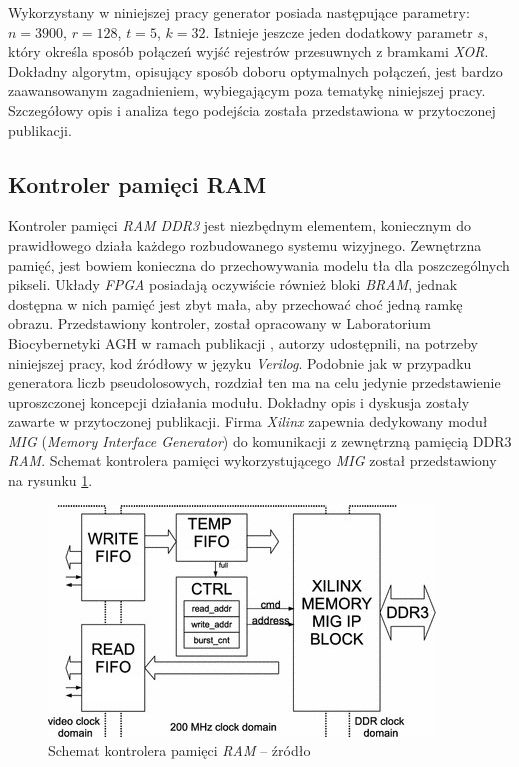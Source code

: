 Wykorzystany w niniejszej pracy generator posiada następujące parametry: $n=3900$, $r=128$, $t=5$, $k=32$. 
Istnieje jeszcze jeden dodatkowy parametr $s$, który określa sposób połączeń wyjść rejestrów przesuwnych z bramkami \textit{XOR}. 
Dokładny algorytm, opisujący sposób doboru optymalnych połączeń, jest bardzo zaawansowanym zagadnieniem, wybiegającym poza tematykę niniejszej pracy. 
Szczegółowy opis i analiza tego podejścia została przedstawiona w przytoczonej publikacji.

\subsection{Kontroler pamięci RAM}
\label{subsec:fpga_ram_kontroler}

Kontroler pamięci \textit{RAM DDR3} jest niezbędnym elementem, koniecznym do prawidłowego działa każdego rozbudowanego systemu wizyjnego. Zewnętrzna pamięć, jest bowiem konieczna do przechowywania modelu tła dla poszczególnych pikseli. Układy \textit{FPGA} posiadają oczywiście również bloki \textit{BRAM}, jednak dostępna w nich pamięć jest zbyt mała, aby przechować choć jedną ramkę obrazu. 
Przedstawiony kontroler, został opracowany w Laboratorium Biocybernetyki AGH w ramach publikacji \cite{kryjak_14_hd_fpga}, autorzy udostępnili, na potrzeby niniejszej pracy, kod źródłowy w języku \textit{Verilog}.
Podobnie jak w przypadku generatora liczb pseudolosowych, rozdział ten ma na celu jedynie przedstawienie uproszczonej koncepcji działania modułu.
Dokładny opis i dyskusja zostały zawarte w przytoczonej publikacji. 
Firma \textit{Xilinx} zapewnia dedykowany moduł \textit{MIG} (\textit{Memory Interface Generator}) do komunikacji z zewnętrzną pamięcią DDR3 \textit{RAM}. 
Schemat kontrolera pamięci wykorzystującego \textit{MIG} został przedstawiony na rysunku \ref{fig:ram_ctrl}. 

	\begin{figure}[h!]
		\centering
		\includegraphics[scale=0.9]{img/4/ram_ctrl_scheme.jpg}
		\caption{Schemat kontrolera pamięci \textit{RAM} -- źródło \cite{kryjak_14_hd_fpga}}
		\label{fig:ram_ctrl}
	\end{figure}

